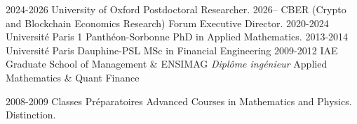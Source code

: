 \begin{center}
\end{center}


\vspace{0mm}
\begin{cvskills}

    \cvskill
    {2024-2026} %
    {University of Oxford} %
    {Postdoctoral Researcher.} %
    \cvskill
    {2026--} %
    {CBER (Crypto and Blockchain Economics Research) Forum} %
    {Executive Director.} %
    \cvskill
    {2020-2024} %
    {Université Paris 1 Panthéon-Sorbonne} %
    {PhD in Applied Mathematics.} %
  \cvskill
    {2013-2014} %
    {Université Paris Dauphine-PSL} %
    {MSc in Financial Engineering} %
\cvskill
    {2009-2012} %
    {IAE Graduate School of Management \& ENSIMAG} %
    {\textit{Diplôme ingénieur} Applied Mathematics \& Quant Finance} %

  \cvskill
    {2008-2009} %
    {Classes Préparatoires} %
    {Advanced Courses in Mathematics and Physics. Distinction.} %

\end{cvskills}




